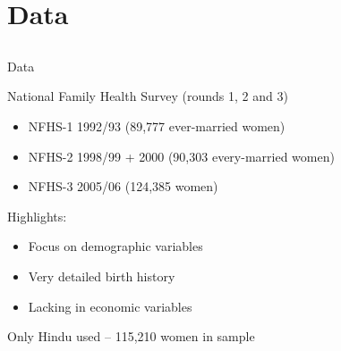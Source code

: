 \documentclass[red]{beamer}
\newcommand{\be}{\begin{itemize}}
\newcommand{\ee}{\end{itemize}}
\begin{document}
% 
% 
% 
% 
% 
% 
% 
% 
% 


\section{Data}
\subsection{}

\begin{frame}{Data}

National Family Health Survey (rounds 1, 2 and 3)
    \be
    \item NFHS-1 1992/93 (89,777 ever-married women)
    \item NFHS-2 1998/99 + 2000 (90,303 every-married women)
    \item NFHS-3 2005/06 (124,385 women)
    \ee
    
\bigskip
    
Highlights:    
\be    
\item Focus on demographic variables
\item Very detailed birth history
\item Lacking in economic variables
\ee

\bigskip

Only Hindu used -- 115,210 women in sample

\end{frame}
\end{document}
